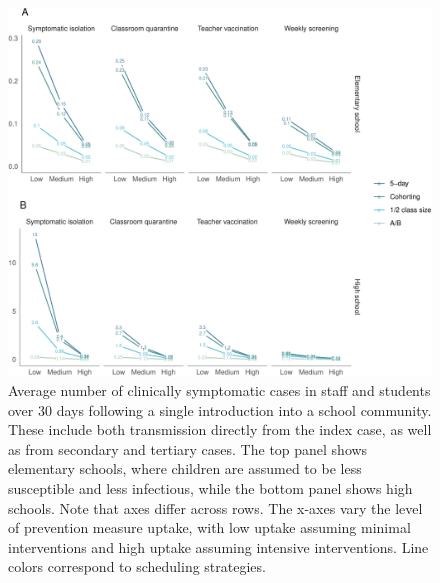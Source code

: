 \documentclass[
]{article}
\begin{document}
\begin{figure}
\centering
\includegraphics{Schools_draft_files/figure-latex/fign-1.pdf}
\caption{\label{figs4} Average number of clinically symptomatic cases in
staff and students over 30 days following a single introduction into a
school community. These include both transmission directly from the
index case, as well as from secondary and tertiary cases. The top panel
shows elementary schools, where children are assumed to be less
susceptible and less infectious, while the bottom panel shows high
schools. Note that axes differ across rows. The x-axes vary the level of
prevention measure uptake, with low uptake assuming minimal
interventions and high uptake assuming intensive interventions. Line
colors correspond to scheduling strategies.}
\end{figure}
\end{document}
